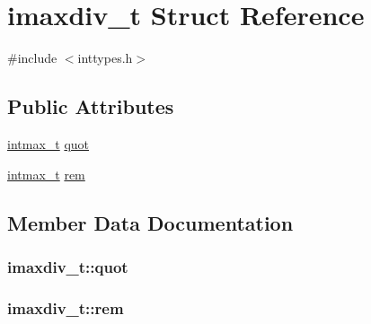 \section{imaxdiv\-\_\-t Struct Reference}
\label{structimaxdiv__t}


{\ttfamily \#include $<$inttypes.\-h$>$}

\subsection*{Public Attributes}
\begin{DoxyCompactItemize}
\item 
\hyperlink{orstdint_8h_a1a3f3321a0166a004bde0a1e72553f2b}{intmax\-\_\-t} \hyperlink{structimaxdiv__t_a9339814cbb7610c72fb7d30c6573b393}{quot}
\item 
\hyperlink{orstdint_8h_a1a3f3321a0166a004bde0a1e72553f2b}{intmax\-\_\-t} \hyperlink{structimaxdiv__t_a6c9701ad10bff81edae7ff679cae7850}{rem}
\end{DoxyCompactItemize}


\subsection{Member Data Documentation}
\subsubsection[{quot}]{ imaxdiv\-\_\-t\-::quot}\label{structimaxdiv__t_a9339814cbb7610c72fb7d30c6573b393}
\subsubsection[{rem}]{ imaxdiv\-\_\-t\-::rem}\label{structimaxdiv__t_a6c9701ad10bff81edae7ff679cae7850}
